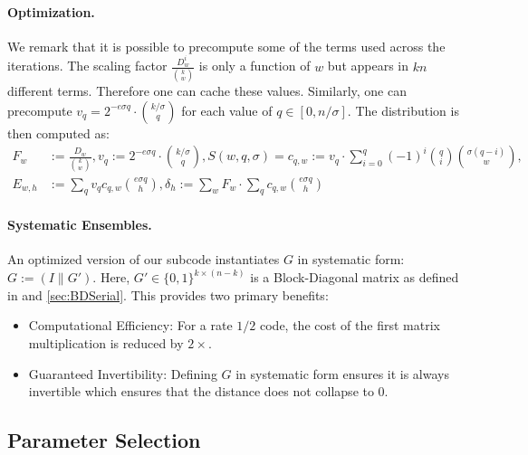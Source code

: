 \paragraph{Optimization.} We remark that it is possible to precompute some of the terms used across the iterations. The scaling factor $\frac{D^i_{w}}{{k\choose w}}$ is only a function of $w$ but appears in $kn$ different terms. Therefore one can cache these values. Similarly, one can precompute $v_q=2^{-e\sigma q} \cdot{k/\sigma \choose q }$ for each value of $q\in[0,n/\sigma]$. The distribution is then computed as:
\begin{align*}
F_w&:=\frac{D_{w}}{{k\choose w}},
v_q:=2^{-e\sigma q} \cdot{k/\sigma \choose q },
S(w,q,\sigma)=c_{q,w} := v_q \cdot \sum_{i=0}^q (-1)^i {q \choose i} {\sigma(q-i) \choose w},\\
E_{w,h} &:= \sum_q v_q c_{q,w}  {e\sigma q \choose h },
\delta_h := \sum_w F_w   \cdot \sum_q c_{q,w}   {e\sigma q \choose h }
\end{align*}



\paragraph{Systematic Ensembles.} 
An optimized version of our subcode instantiates $G$ in systematic form: $G := (I \parallel G')$. Here, $G' \in \{0,1\}^{k \times (n-k)}$ is a Block-Diagonal matrix as defined in  and \ref{sec:BDSerial}. This provides two primary benefits:
\begin{itemize}
    \item 
Computational Efficiency: For a rate $1/2$ code, the cost of the first matrix multiplication is reduced by $2\times$.
\item 
Guaranteed Invertibility: Defining $G$ in systematic form ensures it is always invertible which ensures that the distance does not collapse to 0.
\end{itemize}

\iffalse
\subsection{Parameter Selection}\label{sec:params}

